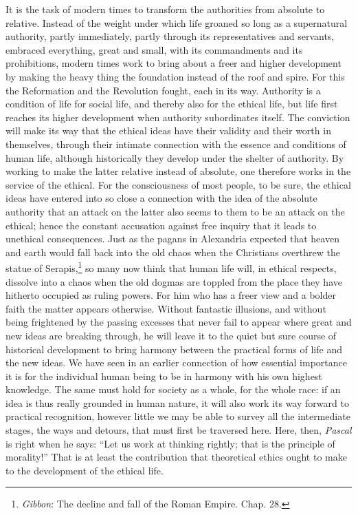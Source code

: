 \documentclass[12pt,a4paper,openany]{book}
\newcommand{\opage}[1]{\marginnote{\footnotesize\textit{[#1]}}}
\begin{document}
It is the task of modern times to transform the authorities from absolute to
relative. Instead of the weight under which life groaned so long as a
supernatural authority, partly immediately, partly through its representatives
and servants, embraced everything, great and small, with its commandments and
its prohibitions, modern times work to bring about a freer and higher
development by making the heavy thing the foundation instead of the roof and
spire. For this the Reformation and the Revolution fought, each in its
\opage{77}way. Authority is a condition of life for social life, and thereby
also for the ethical life, but life first reaches its higher development when
authority subordinates itself. The conviction will make its way that the
ethical ideas have their validity and their worth in themselves, through their
intimate connection with the essence and conditions of human life, although
historically they develop under the shelter of authority. By working to make
the latter relative instead of absolute, one therefore works in the service of
the ethical. For the consciousness of most people, to be sure, the ethical
ideas have entered into so close a connection with the idea of the absolute
authority that an attack on the latter also seems to them to be an attack on
the ethical; hence the constant accusation against free inquiry that it leads
to unethical consequences. Just as the pagans in Alexandria expected that
heaven and earth would fall back into the old chaos when the Christians
overthrew the statue of Serapis,\footnote[1]{\emph{Gibbon}: The decline and
fall of the Roman Empire. Chap. 28.} so many now think that human life will,
in ethical respects, dissolve into a chaos when the old dogmas are toppled
from the place they have hitherto occupied as ruling powers. For him who has a
freer view and a bolder faith the matter appears otherwise. Without fantastic
illusions, and without being frightened by the passing excesses that never
fail to appear where great and new ideas are breaking through, he will leave
it to \opage{78}the quiet but sure course of historical development to bring
harmony between the practical forms of life and the new ideas. We have seen in
an earlier connection of how essential importance it is for the individual
human being to be in harmony with his own highest knowledge. The same must
hold for society as a whole, for the whole race: if an idea is thus really
grounded in human nature, it will also work its way forward to practical
recognition, however little we may be able to survey all the intermediate
stages, the ways and detours, that must first be traversed here. Here, then,
\emph{Pascal} is right when he says: ``Let us work at thinking rightly; that
is the principle of morality!'' That is at least the contribution that
theoretical ethics ought to make to the development of the ethical life.
\end{document}
